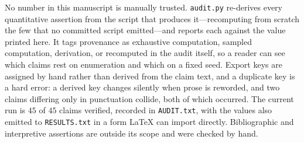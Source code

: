 \documentclass[11pt]{article}
\begin{document}
No number in this manuscript is manually trusted. \texttt{audit.py} re-derives every
quantitative assertion from the script that produces it---recomputing from scratch the few
that no committed script emitted---and reports each against the value printed here. It
tags provenance as exhaustive computation, sampled computation, derivation, or recomputed
in the audit itself, so a reader can see which claims rest on enumeration and which on a
fixed seed. Export keys are assigned by hand rather than derived from the claim text, and
a duplicate key is a hard error: a derived key changes silently when prose is reworded,
and two claims differing only in punctuation collide, both of which occurred. The current run is $45$ of $45$ claims verified, recorded in
\texttt{AUDIT.txt}, with the values also emitted to \texttt{RESULTS.txt} in a form
\LaTeX{} can import directly. Bibliographic and interpretive assertions are outside its
scope and were checked by hand.
\end{document}
